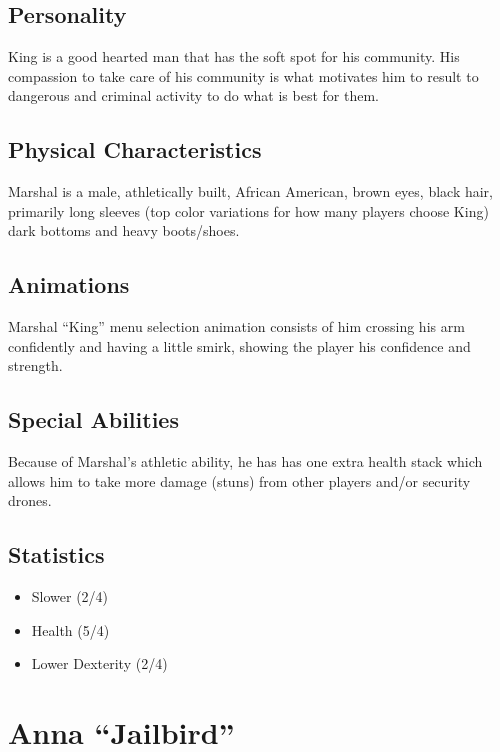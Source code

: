 \documentclass[14pt]{report}
\begin{document}
\subsection{Personality}

King is a good hearted man that has the soft spot for his community. His compassion to take care of his community is what motivates him to result to dangerous and criminal activity to do what is best for them.

\subsection{Physical Characteristics}

Marshal is a male, athletically built, African American, brown eyes, black hair, primarily long sleeves (top color variations for how many players choose King) dark bottoms and heavy boots/shoes.

\subsection{Animations}

Marshal “King” menu selection animation consists of him crossing his arm confidently and having a little smirk, showing the player his confidence and strength.

\subsection{Special Abilities}

Because of Marshal’s athletic ability, he has has one extra health stack which allows him to take more damage (stuns) from other players and/or security drones.

\subsection{Statistics}


\begin{itemize}
    \item Slower (2/4)
    \item Health (5/4)
    \item Lower Dexterity (2/4)
\end{itemize}

\section{Anna ``Jailbird''}
\end{document}

